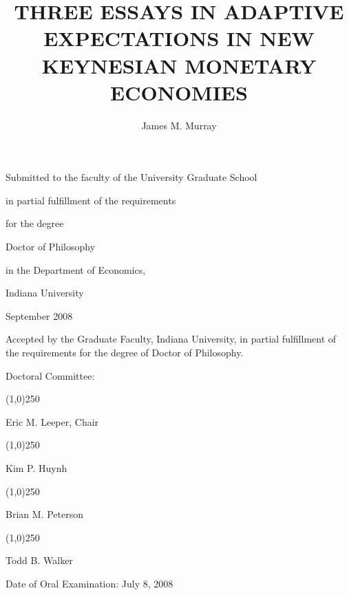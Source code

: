 \documentclass[12pt,notitlepage,oneside]{book}
\begin{document}

\title{THREE ESSAYS IN ADAPTIVE EXPECTATIONS IN NEW KEYNESIAN MONETARY ECONOMIES}
\author{James M. Murray}
\date{}

\maketitle
\thispagestyle{empty}
\vspace*{3.5in}
\begin{center}
\begin{singlespace}
 Submitted to the faculty of the University Graduate School

 in partial fulfillment of the requirements

 for the degree

 Doctor of Philosophy

 in the Department of Economics,

 Indiana University

 September 2008
\end{singlespace}
\end{center}
\newpage

\begin{center}
Accepted by the Graduate Faculty, Indiana University, in partial fulfillment of the requirements for the degree of Doctor of Philosophy.

\vspace{0.5in}

Doctoral Committee:

\vspace{0.5in}

\line(1,0){250}

Eric M. Leeper, Chair

\vspace{0.5in}

\line(1,0){250}

Kim P. Huynh

\vspace{0.5in}

\line(1,0){250}

Brian M. Peterson

\vspace{0.5in}

\line(1,0){250}

Todd B. Walker

\vspace{2.6in}

Date of Oral Examination:  July 8, 2008

\end{center}
\newpage
\end{document}
